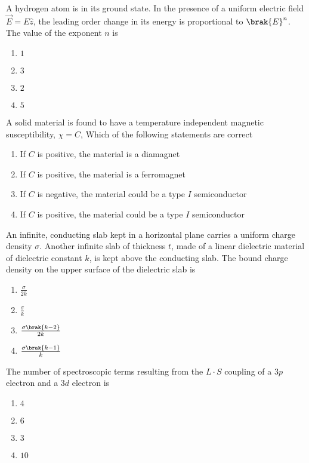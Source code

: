 \item{
A hydrogen atom is in its ground state. In the presence of a uniform electric field $\overrightarrow{E} = E\hat{z}$, the leading order change in its energy is proportional to $\brak{E}^n$. The value of the exponent $n$ is
\begin{multicols}{4}
\begin{enumerate}
\item $1$
\item $3$
\item $2$
\item $5$
\end{enumerate}
\end{multicols}
}
\item{
A solid material is found to have a temperature independent magnetic susceptibility, $\chi=C$, Which of the following statements are correct
\begin{enumerate}
\item If $C$ is positive, the material is a diamagnet
\item If $C$ is positive, the material is a ferromagnet
\item If $C$ is negative, the material could be a type $I$ semiconductor
\item If $C$ is positive, the material could be a type $I$ semiconductor
\end{enumerate}
}
\item{
An infinite, conducting slab kept in a horizontal plane carries a uniform charge density $\sigma$. Another infinite slab of thickness $t$, made of a linear dielectric material of dielectric constant $k$, is kept above the conducting slab. The bound charge density on the upper surface of the dielectric slab is
\begin{multicols}{4}
\begin{enumerate}
\item $\frac{\sigma}{2k}$
\item $\frac{\sigma}{k}$
\item $\frac{\sigma\brak{k-2}}{2k}$
\item $\frac{\sigma\brak{k-1}}{k}$
\end{enumerate}
\end{multicols}
}
\item{
The number of spectroscopic terms resulting from the $L\cdot S$ coupling of a $3p$ electron and a $3d$ electron is
\begin{multicols}{4}
\begin{enumerate}
\item $4$
\item $6$
\item $3$
\item $10$
\end{enumerate}
\end{multicols}
}
